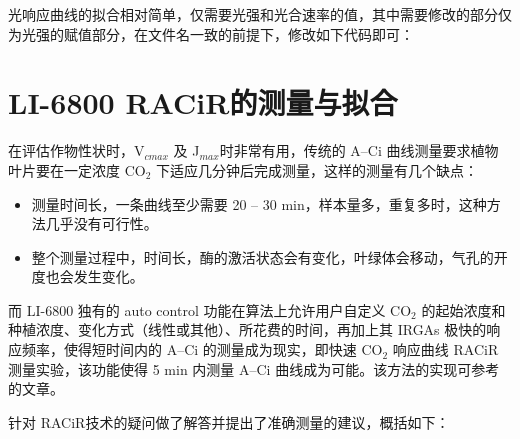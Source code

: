 \documentclass[
]{krantz}
\makeatletter
\newenvironment{Shaded}{\begin{snugshade}}{\end{snugshade}}
\newcommand{\NormalTok}[1]{#1}
\newcommand{\OtherTok}[1]{\textcolor[rgb]{0.56,0.35,0.01}{#1}}
\newcommand{\SpecialCharTok}[1]{\textcolor[rgb]{0.00,0.00,0.00}{#1}}
\providecommand{\tightlist}{%
  \setlength{\itemsep}{0pt}\setlength{\parskip}{0pt}}
\newenvironment{kframe}{%
\medskip{}
\setlength{\fboxsep}{.8em}
 \def\at@end@of@kframe{}%
 \ifinner\ifhmode%
  \def\at@end@of@kframe{\end{minipage}}%
  \begin{minipage}{\columnwidth}%
 \fi\fi%
 \def\FrameCommand##1{\hskip\@totalleftmargin \hskip-\fboxsep
 \colorbox{shadecolor}{##1}\hskip-\fboxsep
     \hskip-\linewidth \hskip-\@totalleftmargin \hskip\columnwidth}%
 \MakeFramed {\advance\hsize-\width
   \@totalleftmargin\z@ \linewidth\hsize
   \@setminipage}}%
 {\par\unskip\endMakeFramed%
 \at@end@of@kframe}
\renewenvironment{Shaded}{\begin{kframe}}{\end{kframe}}
\makeatother
\begin{document}
光响应曲线的拟合相对简单，仅需要光强和光合速率的值，其中需要修改的部分仅为光强的赋值部分，在文件名一致的前提下，修改如下代码即可：

\begin{Shaded}
\end{Shaded}

\cleardoublepage

\hypertarget{racir68}{%
\section{\texorpdfstring{LI-6800 RACiR\texttrademark 的测量与拟合}{LI-6800 RACiR的测量与拟合}}\label{racir68}}

在评估作物性状时，V\(_{cmax}\) 及 J\(_{max}\)时非常有用，传统的 A--Ci 曲线测量要求植物叶片要在一定浓度 CO\(_{2}\)
下适应几分钟后完成测量，这样的测量有几个缺点：

\begin{itemize}
\tightlist
\item
  测量时间长，一条曲线至少需要 20 -- 30 min，样本量多，重复多时，这种方法几乎没有可行性。
\item
  整个测量过程中，时间长，酶的激活状态会有变化，叶绿体会移动，气孔的开度也会发生变化。
\end{itemize}

而 LI-6800 独有的 auto control 功能在算法上允许用户自定义 CO\(_{2}\) 的起始浓度和种植浓度、变化方式（线性或其他）、所花费的时间，再加上其
IRGAs 极快的响应频率，使得短时间内的 A--Ci 的测量成为现实，即快速 CO\(_{2}\) 响应曲线 RACiR\texttrademark
测量实验，该功能使得 5 min 内测量 A--Ci 曲线成为可能。该方法的实现可参考 \citet{stinziano2017}
的文章。

\citet{stinziano2018} 针对 RACiR\texttrademark 技术的疑问做了解答并提出了准确测量的建议，概括如下：
\end{document}
